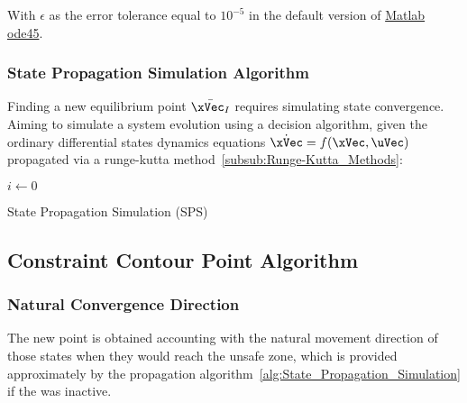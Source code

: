 With \(\epsilon\) as the error tolerance equal to \(10^{-5}\) in the default version of \href{https://www.mathworks.com/help/matlab/ref/ode45.html}{Matlab ode45}.

\subsubsection{State Propagation Simulation Algorithm}
\label{subsub:State_Propagation_Simulation_Algorithm}

Finding a new equilibrium point \(\bar{\xVec_I}\) requires simulating state convergence. Aiming to simulate a system evolution using a decision algorithm, given the ordinary differential states dynamics equations \(\dot{\xVec} = f(\xVec,\uVec)\) propagated via a runge-kutta method~\ref{subsub:Runge-Kutta_Methods}:

  \begin{algorithm}
    \KwResult{$\xVec$, $\uVec$}
    $i \gets 0$ \;
    \caption{State Propagation Simulation (SPS)} \label{alg:State_Propagation_Simulation}
  \end{algorithm}


\newpage %

\subsection{Constraint Contour Point Algorithm}
\label{subsec:Constraint_Contour_Point_Algorithm}

\subsubsection{Natural Convergence Direction}
\label{subsubsec:Intersection_Vector}

The new point is obtained accounting with the natural movement direction of those states when they would reach the unsafe zone, which is provided approximately by the propagation algorithm~\ref{alg:State_Propagation_Simulation} if the  was inactive. 

